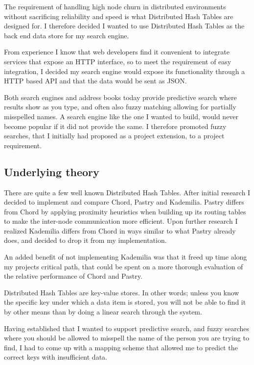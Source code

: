 The requirement of handling high node churn in distributed environments without sacrificing reliability and speed is what Distributed Hash Tables are designed for. I therefore decided I wanted to use Distributed Hash Tables as the back end data store for my search engine.

From experience I know that web developers find it convenient to integrate services that expose an HTTP interface, so to meet the requirement of easy integration, I decided my search engine would expose its functionality through a HTTP based API and that the data would be sent as JSON.

Both search engines and address books today provide predictive search where results show as you type, and often also fuzzy matching allowing for partially misspelled names. A search engine like the one I wanted to build, would never become popular if it did not provide the same. I therefore promoted fuzzy searches, that I initially had proposed as a project extension, to a project requirement.

\subsection{Underlying theory}
There are quite a few well known Distributed Hash Tables. After initial research I decided to implement and compare Chord, Pastry and Kademilia. Pastry differs from Chord by applying proximity heuristics when building up its routing tables to make the inter-node communication more efficient. Upon further research I realized Kademilia differs from Chord in ways similar to what Pastry already does, and decided to drop it from my implementation.

An added benefit of not implementing Kademilia was that it freed up time along my projects critical path, that could be spent on a more thorough evaluation of the relative performance of Chord and Pastry.

\mbox{}

Distributed Hash Tables are key-value stores. In other words; unless you know the specific key under which a data item is stored, you will not be able to find it by other means than by doing a linear search through the system.

Having established that I wanted to support predictive search, and fuzzy searches where you should be allowed to misspell the name of the person you are trying to find, I had to come up with a mapping scheme that allowed me to predict the correct keys with insufficient data.

